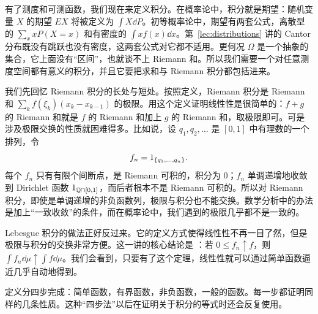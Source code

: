 \label{lec:integration}

有了测度和可测函数，我们现在来定义积分。在概率论中，积分就是期望：随机变量 $X$ 的期望 $EX$ 将被定义为 $\int X\dd P$。初等概率论中，期望有两套公式，离散型的 $\sum_xxP(X=x)$ 和有密度的 $\int xf(x)\dd x$。第~\ref{lec:distributions} 讲的 Cantor 分布既没有跳跃也没有密度，这两套公式对它都不适用。更何况 $\Omega$ 是一个抽象的集合，它上面没有“区间”，也就谈不上 Riemann 和。所以我们需要一个对任意测度空间都有意义的积分，并且它要把求和与 Riemann 积分都包括进来。

我们先回忆 Riemann 积分的长处与短处。按照定义，Riemann 积分是 Riemann 和 $\sum_kf(\xi_k)(x_k-x_{k-1})$ 的极限。用这个定义证明线性性是很简单的：$f+g$ 的 Riemann 和就是 $f$ 的 Riemann 和加上 $g$ 的 Riemann 和，取极限即可。可是涉及极限交换的性质就困难得多。比如说，设 $q_1,q_2,\dots$ 是 $[0,1]$ 中有理数的一个排列，令
\[
f_n=1_{\{q_1,\dots,q_n\}}.
\]
每个 $f_n$ 只有有限个间断点，是 Riemann 可积的，积分为 $0$；$f_n$ 单调递增地收敛到 Dirichlet 函数 $1_{\mathbb{Q}\cap[0,1]}$，而后者根本不是 Riemann 可积的。所以对 Riemann 积分，即使是单调递增的非负函数列，极限与积分也不能交换。数学分析中的办法是加上“一致收敛”的条件，而在概率论中，我们遇到的极限几乎都不是一致的。

Lebesgue 积分的做法正好反过来。它的定义方式使得线性性不再一目了然，但是极限与积分的交换非常方便。这一讲的核心结论是 ：若 $0\leqslant f_n\uparrow f$，则 $\int f_n\dd\mu\uparrow\int f\dd\mu$。我们会看到，只要有了这个定理，线性性就可以通过简单函数逼近几乎自动地得到。

定义分四步完成：简单函数，有界函数，非负函数，一般的函数。每一步都证明同样的几条性质。这种“四步法”以后在证明关于积分的等式时还会反复使用。


